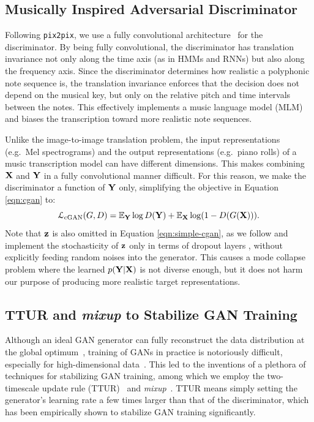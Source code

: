 \subsection{Musically Inspired Adversarial Discriminator}

Following \texttt{pix2pix}, we use a fully convolutional architecture~\cite{long2015fcn} for the discriminator.
By being fully convolutional, the discriminator has translation invariance not only along the time axis (as in HMMs and RNNs) but also along the frequency axis.
Since the discriminator determines how realistic a polyphonic note sequence is, the translation invariance enforces that the decision does not depend on the musical key, but only on the relative pitch and time intervals between the notes.
This effectively implements a music language model (MLM)~\cite{boulangerlewandowski2012temporal,sigtia2016endtoend} and biases the transcription toward more realistic note sequences.

Unlike the image-to-image translation problem, the input representations (e.g.~Mel spectrograms) and the output representations (e.g.~piano rolls) of a music transcription model can have different dimensions.
This makes combining $\mathbf{X}$ and $\mathbf{Y}$ in a fully convolutional manner difficult.
For this reason, we make the discriminator a function of $\mathbf{Y}$ only, simplifying the objective in Equation \ref{eqn:cgan} to:
\begin{equation}\label{eqn:simple-cgan}
\mathcal{L}_{\text{cGAN}}(G, D) =  \mathbb{E}_{\mathbf{Y}}  \log D(\mathbf{Y}) + \mathbb{E}_{\mathbf{X}} \log (1 - D ( G(\mathbf{X}))).
\end{equation}
Note that $\mathbf{z}$ is also omitted in Equation \ref{eqn:simple-cgan}, as we follow \cite{isola2017pix2pix} and implement the stochasticity of $\mathbf{z}$ only in terms of dropout layers \cite{srivastava2014dropout}, without explicitly feeding random noises into the generator.
This causes a mode collapse problem where the learned $p(\mathbf{Y}|\mathbf{X})$ is not diverse enough, but it does not harm our purpose of producing more realistic target representations.

\subsection{TTUR and \textit{mixup} to Stabilize GAN Training}

Although an ideal GAN generator can fully reconstruct the data distribution at the global optimum~\cite{goodfellow2014gan}, training of GANs in practice is notoriously difficult, especially for high-dimensional data~\cite{goodfellow2016gan}.
This led to the inventions of a plethora of techniques for stabilizing GAN training, among which we employ the two-timescale update rule (TTUR)~\cite{heusel2017ttur} and \textit{mixup}~\cite{zhang2018mixup}.
TTUR means simply setting the generator's learning rate a few times larger than that of the discriminator, which has been empirically shown to stabilize GAN training significantly.

